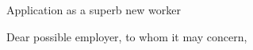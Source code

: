 
\opening{		
	\large{Application as a superb new worker} \normalsize 
}

\makelettertitle\justifying

Dear possible employer, to whom it may concern,
